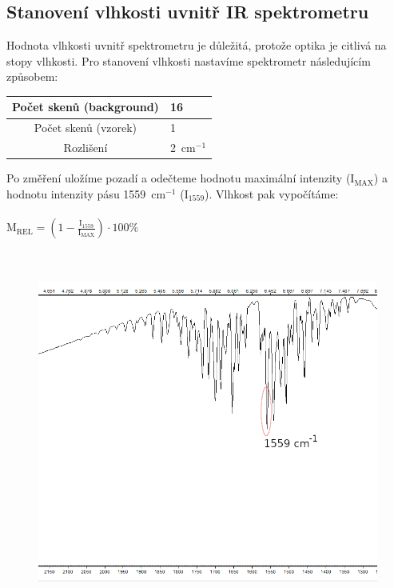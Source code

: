 \documentclass[12pt]{article}
\begin{document}
\subsection{Stanovení vlhkosti uvnitř IR spektrometru}


Hodnota vlhkosti uvnitř spektrometru je důležitá, protože optika je citlivá na stopy vlhkosti. Pro stanovení vlhkosti nastavíme spektrometr následujícím způsobem:

\vspace{5mm}
\begin{tabular}{|c|l|}
	\hline
	Počet skenů (background) & 16 \\\hline
	Počet skenů (vzorek) & 1 \\\hline
	Rozlišení & 2~cm$^{-1}$ \\\hline
\end{tabular}
\vspace{5mm}

Po změření uložíme pozadí a odečteme hodnotu maximální intenzity (I$_{\textrm{MAX}}$) a hodnotu intenzity pásu 1559~cm$^{-1}$ (I$_{1559}$). Vlhkost pak vypočítáme:
\\
\\
$\textrm{M}_{\textrm{REL}} = (1 - \frac{\textrm{I}_{1559}}{\textrm{I}_{\textrm{MAX}}}) \cdot 100 \%$

\begin{figure}[h]
	\includegraphics[keepaspectratio,height=12cm]{img/moisture.png}
\end{figure}
\end{document}
